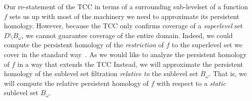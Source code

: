 
Our re-statement of the TCC in terms of a surrounding sub-levelset of a function $f$ sets us up with most of the machinery we need to approximate its persistent homology.
However, because the TCC only confirms coverage of a \emph{superlevel} set $D\setminus B_\omega$, we cannot guarantee coverage of the entire domain.
Indeed, we could compute the persistent homology of the \emph{restriction} of $f$ to the superlevel set we cover in the standard way~\cite{chazal09analysis}.%
As we would like to analyze the persistent homology of $f$ in a way that extends the TCC
Instead, we will approximate the persistent homology of the sublevel set filtration \emph{relative to} the sublevel set $B_\omega$.
That is, we will compute the relative persistent homology of $f$ with respect to a \emph{static} sublevel set $B_\omega$.

